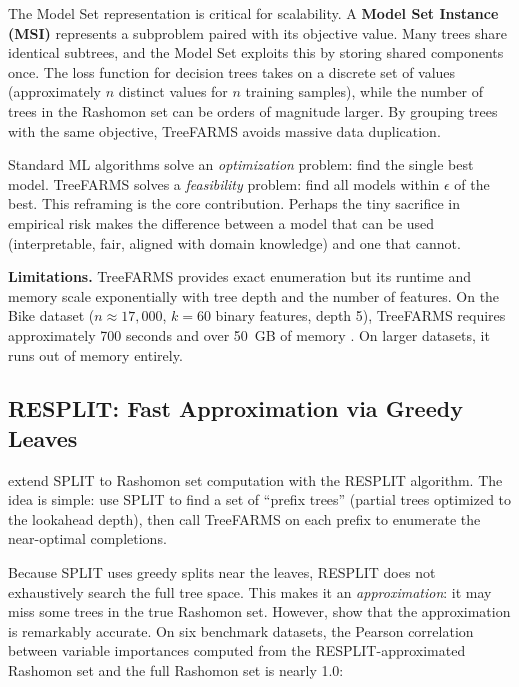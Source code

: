 The Model Set representation is critical for scalability.  A
\textbf{Model Set Instance (MSI)} represents a subproblem paired with its
objective value.  Many trees share identical subtrees, and the Model Set
exploits this by storing shared components once.  The loss function for
decision trees takes on a discrete set of values (approximately $n$ distinct
values for $n$ training samples), while the number of trees in the Rashomon
set can be orders of magnitude larger.  By grouping trees with the same
objective, TreeFARMS avoids massive data duplication.

\begin{keyidea}
Standard ML algorithms solve an \emph{optimization} problem: find the single
best model.  TreeFARMS solves a \emph{feasibility} problem: find all models
within $\epsilon$ of the best.  This reframing is the core contribution.
Perhaps the tiny sacrifice in empirical risk makes the difference between a
model that can be used (interpretable, fair, aligned with domain knowledge)
and one that cannot.
\end{keyidea}

\textbf{Limitations.}  TreeFARMS provides exact enumeration but its runtime
and memory scale exponentially with tree depth and the number of features.
On the Bike dataset ($n \approx 17{,}000$, $k = 60$ binary features, depth
5), TreeFARMS requires approximately 700 seconds and over 50~GB of memory
\citep{HeileBabbar2025}.  On larger datasets, it runs out of memory entirely.

\subsection{RESPLIT: Fast Approximation via Greedy Leaves}
\label{sec:rashomon:resplit}

\citet{BabbarEtAl2025} extend SPLIT to Rashomon set computation with the
RESPLIT algorithm.  The idea is simple: use SPLIT to find a set of
``prefix trees'' (partial trees optimized to the lookahead depth), then call
TreeFARMS on each prefix to enumerate the near-optimal completions.

Because SPLIT uses greedy splits near the leaves, RESPLIT does not
exhaustively search the full tree space.  This makes it an
\emph{approximation}: it may miss some trees in the true Rashomon set.
However, \citet{BabbarEtAl2025} show that the approximation is remarkably
accurate.  On six benchmark datasets, the Pearson correlation between
variable importances computed from the RESPLIT-approximated Rashomon set
and the full Rashomon set is nearly 1.0:

